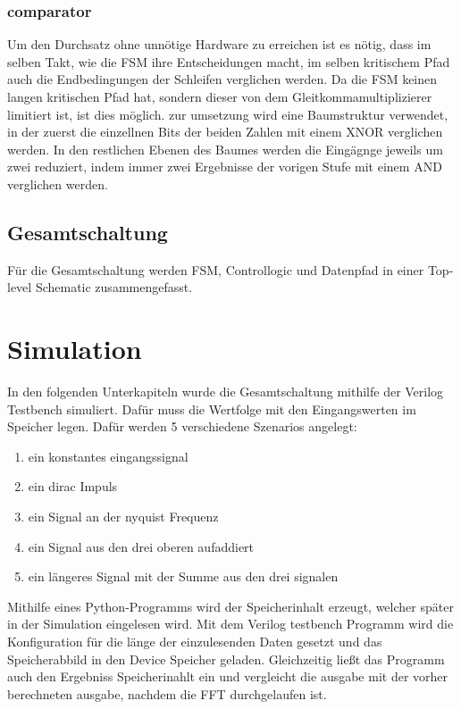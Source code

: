 \documentclass[fontsize=12pt,paper=a4,ngerman]{scrarticle}
\begin{document}
\subsubsection{comparator}
Um den Durchsatz ohne unnötige Hardware zu erreichen ist es nötig, dass im
selben Takt, wie die FSM ihre Entscheidungen macht, im selben kritischem Pfad
auch die Endbedingungen der Schleifen verglichen werden. Da die FSM keinen
langen kritischen Pfad hat, sondern dieser von dem Gleitkommamultiplizierer
limitiert ist, ist dies möglich. zur umsetzung wird eine Baumstruktur
verwendet, in der zuerst die einzellnen Bits der beiden Zahlen mit einem XNOR
verglichen werden. In den restlichen Ebenen des Baumes werden die Eingägnge
jeweils um zwei reduziert, indem immer zwei Ergebnisse der vorigen Stufe mit
einem AND verglichen werden.

\subsection{Gesamtschaltung}
Für die Gesamtschaltung werden FSM, Controllogic und Datenpfad in einer
Top-level Schematic zusammengefasst. %

\section{Simulation}
In den folgenden Unterkapiteln wurde die Gesamtschaltung mithilfe der Verilog
Testbench simuliert. Dafür muss die Wertfolge mit den Eingangswerten im
Speicher legen. Dafür werden 5 verschiedene Szenarios angelegt:
\begin{enumerate}
	\item ein konstantes eingangssignal
	\item ein dirac Impuls
	\item ein Signal an der nyquist Frequenz
	\item ein Signal aus den drei oberen aufaddiert
	\item ein längeres Signal mit der Summe aus den drei signalen
\end{enumerate}

Mithilfe eines Python-Programms wird der Speicherinhalt erzeugt, welcher später
in der Simulation eingelesen wird. Mit dem Verilog testbench Programm wird die
Konfiguration für die länge der einzulesenden Daten gesetzt und das
Speicherabbild in den Device Speicher geladen. Gleichzeitig ließt das Programm
auch den Ergebniss Speicherinahlt ein und vergleicht die ausgabe mit der vorher
berechneten ausgabe, nachdem die FFT durchgelaufen ist.
\end{document}
